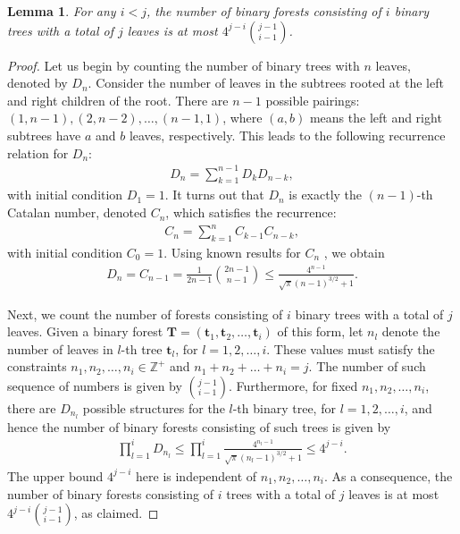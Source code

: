 \documentclass[superscriptaddress,onecolumn,nofootinbib,longbibliography,a4paper,accepted=2026-09-29]{quantumarticle}
\theoremstyle{plain}
\newtheorem{lemma}[thm]{Lemma}
\theoremstyle{definition}
\numberwithin{thm}{section}
\numberwithin{assumption}{section}
\numberwithin{lemma}{section}
\numberwithin{prop}{section}
\numberwithin{cor}{section}
\numberwithin{definition}{section}
\numberwithin{rmk}{section}
\numberwithin{equation}{section}
\newcommand{\mbt}{\mathbf{t}}
\newcommand{\mbf}{\mathbf{T}}
\begin{document}
\begin{lemma}
For any $i<j$, the number of binary forests consisting of $i$ binary trees with a total of $j$ leaves is at most $4^{j-i}\binom{j-1}{i-1}$.
\label{lem:count_binary_forests}
\end{lemma}
\begin{proof}
Let us begin by counting the number of binary trees with \( n \) leaves, denoted by \( D_n \). Consider the number of leaves in the subtrees rooted at the left and right children of the root. There are \( n-1 \) possible pairings: \( (1, n-1), (2, n-2), \dots, (n-1, 1) \), where \( (a, b) \) means the left and right subtrees have \( a \) and \( b \) leaves, respectively. This leads to the following recurrence relation for \( D_n \):
\begin{align}
    D_n = \sum_{k=1}^{n-1} D_k D_{n-k},    
\end{align}
with initial condition \( D_1 = 1 \). It turns out that \( D_n \) is exactly the \((n-1)\)-th Catalan number, denoted \( C_n \), which satisfies the recurrence:
\begin{align}
    C_n = \sum_{k=1}^{n} C_{k-1} C_{n-k},    
\end{align}
with initial condition \( C_0 = 1 \). Using known results for $C_n$ \cite{stanley1999book}, we obtain
\begin{align}
    D_n=C_{n-1}=\frac{1}{2n-1}\binom{2n-1}{n-1} \le \frac{4^{n-1}}{\sqrt{\pi} (n-1)^{3/2}+1}.
\end{align}

Next, we count the number of forests consisting of \( i \) binary trees with a total of \( j \) leaves. Given a binary forest \( \mbf = (\mathbf{t}_1, \mathbf{t}_2, \dots, \mathbf{t}_i)\) of this form, let \( n_l \) denote the number of leaves in $l$-th tree $\mbt_l$, for $l=1,2,\dots,i$. These values must satisfy the constraints \( n_1, n_2, \dots, n_i \in \mathbb{Z}^+ \) and \( n_1 + n_2 + \dots + n_i = j \). The number of such sequence of numbers is given by $\binom{j-1}{i-1}$. Furthermore, for fixed \( n_1, n_2, \dots, n_i \), there are \( D_{n_l} \) possible structures for the \( l \)-th binary tree, for \( l = 1, 2, \dots, i \), and hence the number of binary  forests consisting of such trees is given by
\begin{align}
\prod_{l=1}^i D_{n_l} \le \prod_{l=1}^i \frac{4^{n_l-1}}{\sqrt{\pi} (n_l-1)^{3/2}+1} 
\le  4^{j-i}.   
\end{align}
The upper bound $4^{j-i}$ here is independent of $n_1, n_2, \dots, n_i$. As a consequence, the number of binary forests consisting of $i$ trees with a total of $j$ leaves is at most
$4^{j-i}\binom{j-1}{i-1}$, as claimed.
\end{proof}
\end{document}
